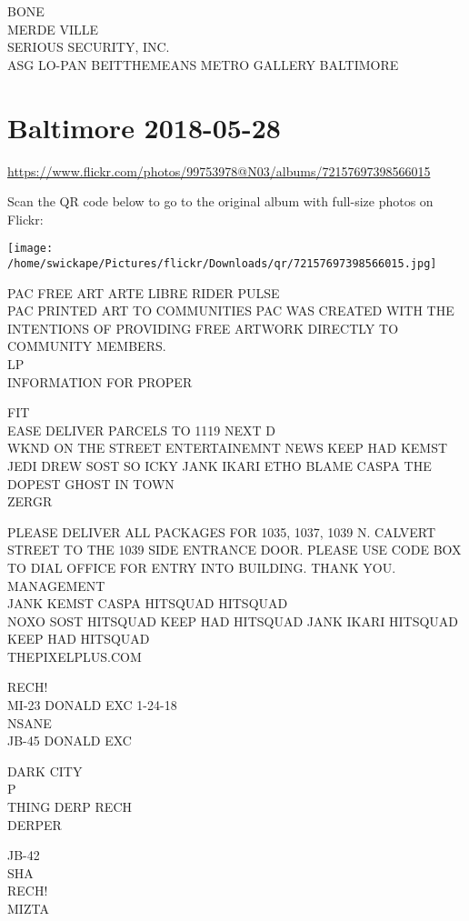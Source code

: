 \documentclass[10pt,letterpaper]{article}
\begin{document}
BONE\\
MERDE VILLE\\
SERIOUS SECURITY, INC.\\
ASG LO{-}PAN BEITTHEMEANS METRO GALLERY BALTIMORE


\section*{Baltimore 2018-05-28}

\url{https://www.flickr.com/photos/99753978@N03/albums/72157697398566015}

Scan the QR code below to go to the original album with full-size photos on Flickr:

\texttt{[image: /home/swickape/Pictures/flickr/Downloads/qr/72157697398566015.jpg]}


PAC FREE ART ARTE LIBRE RIDER PULSE\\
PAC PRINTED ART TO COMMUNITIES PAC WAS CREATED WITH THE INTENTIONS OF PROVIDING FREE ARTWORK DIRECTLY TO COMMUNITY MEMBERS.\\
LP\\
INFORMATION FOR PROPER

FIT\\
EASE DELIVER PARCELS TO 1119 NEXT D\\
WKND ON THE STREET ENTERTAINEMNT NEWS KEEP HAD KEMST JEDI DREW SOST SO ICKY JANK IKARI ETHO BLAME CASPA THE DOPEST GHOST IN TOWN\\
ZERGR

PLEASE DELIVER ALL PACKAGES FOR 1035, 1037, 1039 N. CALVERT STREET TO THE 1039 SIDE ENTRANCE DOOR.  PLEASE USE CODE BOX TO DIAL OFFICE FOR ENTRY INTO BUILDING.  THANK YOU.  MANAGEMENT\\
JANK KEMST CASPA HITSQUAD HITSQUAD\\
NOXO SOST HITSQUAD KEEP HAD HITSQUAD JANK IKARI HITSQUAD KEEP HAD HITSQUAD\\
THEPIXELPLUS.COM

RECH!\\
MI{-}23 DONALD EXC 1{-}24{-}18\\
NSANE\\
JB{-}45 DONALD EXC

DARK CITY\\
P\\
THING DERP RECH\\
DERPER

JB{-}42\\
SHA\\
RECH!\\
MIZTA
\end{document}
